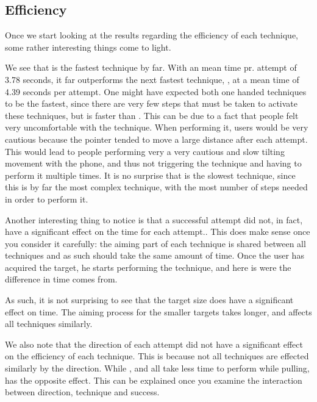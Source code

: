 \subsection{Efficiency}

Once we start looking at the results regarding the efficiency of each technique, some rather interesting things come to light.

We see that \swipe is the fastest technique by far.
With an mean time pr. attempt of 3.78 seconds, it far outperforms the next fastest technique, \throw, at a mean time of 4.39 seconds per attempt. 
One might have expected both one handed techniques to be the fastest, since there are very few steps that must be taken to activate these techniques, but \throw is faster than \tilt. 
This can be due to a fact that people felt very uncomfortable with the \tilt technique.
When performing it, users would be very cautious because the pointer tended to move a large distance after each attempt.
This would lead to people performing very a very cautious and slow tilting movement with the phone, and thus not triggering the technique and having to perform it multiple times. 
It is no surprise that \grab is the slowest technique, since this is by far the most complex technique, with the most number of steps needed in order to perform it.

Another interesting thing to notice is that a successful attempt did not, in fact, have a significant effect on the time for each attempt.. 
This does make sense once you consider it carefully: the aiming part of each technique is shared between all techniques and as such should take the same amount of time.
Once the user has acquired the target, he starts performing the technique, and here is were the difference in time comes from.

As such, it is not surprising to see that the target size does have a significant effect on time.
The aiming process for the smaller targets takes longer, and affects all techniques similarly.

We also note that the direction of each attempt did not have a significant effect on the efficiency of each technique. 
This is because not all techniques are effected similarly by the direction. 
While \swipe, \throw and \tilt all take less time to perform while pulling, \grab has the opposite effect.
This can be explained once you examine the interaction between direction, technique and success.

